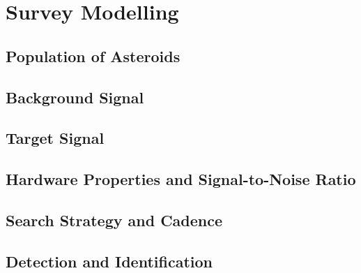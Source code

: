 \chapter{Survey Modelling}

\section{Population of Asteroids}

\section{Background Signal}

\section{Target Signal}

\section{Hardware Properties and Signal-to-Noise Ratio}

\section{Search Strategy and Cadence}

\section{Detection and Identification}
